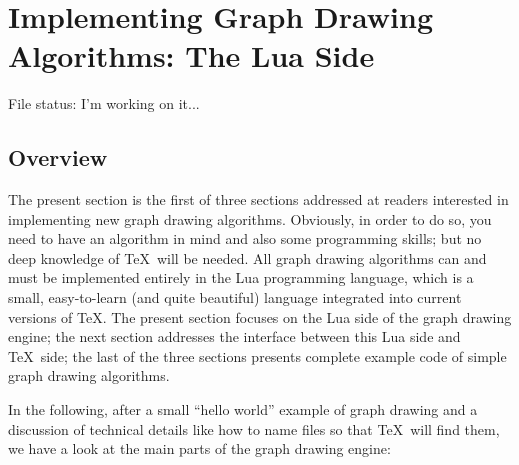 %
%
%


\section{Implementing Graph Drawing Algorithms: The Lua Side}
\label{section-gd-implementation-first}

\label{section-gd-own-algorithm}
\label{section-library-graphdrawing-ownAlgorithm}

File status: I'm working on it...


\subsection{Overview}

The present section is the first of three sections addressed at
readers interested in implementing new graph drawing
algorithms. Obviously, in order to do so, you need to have an
algorithm in mind and also some programming skills; but no deep
knowledge of \TeX\ will be needed. All graph drawing algorithms can
and must be implemented entirely in the Lua programming language,
which is a small, easy-to-learn (and quite beautiful) language
integrated into current versions of \TeX. The present section focuses
on the Lua side of the graph drawing engine; the next section
addresses the interface between this Lua side and \TeX\ side; the last
of the three sections presents complete example code of simple graph
drawing algorithms. 

In the following, after a small ``hello world'' example of graph
drawing and a discussion of technical details like
how to name files so that \TeX\ will find them, we have a look at the
main parts of the graph drawing engine:

